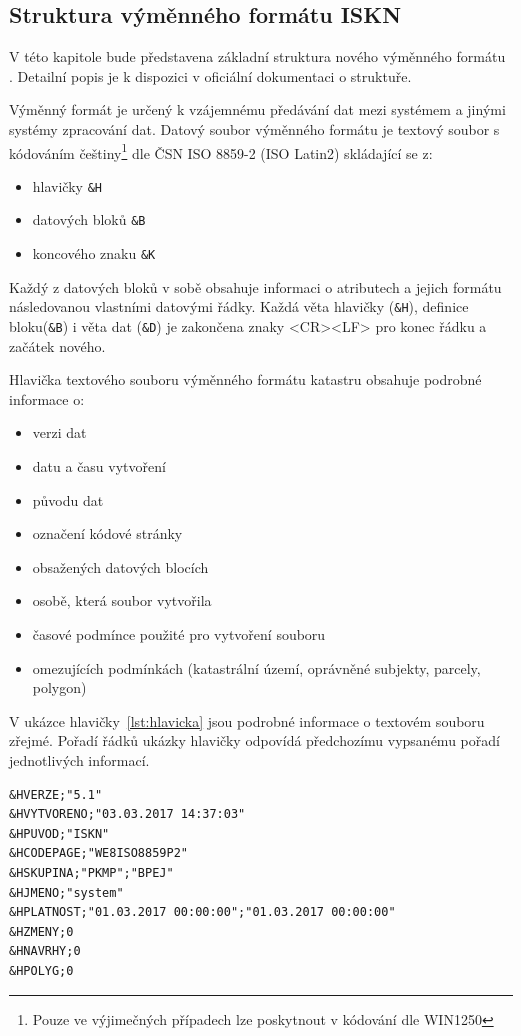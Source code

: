 \subsection{Struktura výměnného formátu ISKN}
V této kapitole bude představena základní struktura nového výměnného
formátu . Detailní popis je k dispozici v oficiální
dokumentaci o struktuře\cite{struktura_ISKN}.

Výměnný formát je určený k vzájemnému předávání dat mezi systémem
 a jinými systémy zpracování dat. Datový soubor výměnného
formátu je textový soubor s kódováním češtiny\footnote{Pouze ve
  výjimečných případech lze poskytnout v kódování dle WIN1250} dle ČSN
ISO 8859-2 (ISO Latin2) skládající se z:
\begin{itemize}[leftmargin=50pt]
		\item hlavičky \verb|&H|
		\item datových bloků \verb|&B|
		\item koncového znaku \verb|&K|
\end{itemize}

Každý z datových bloků v sobě obsahuje informaci o atributech a jejich formátu následovanou vlastními datovými řádky. Každá věta hlavičky (\verb|&H|), definice bloku(\verb|&B|) i věta dat (\verb|&D|) je zakončena znaky <CR><LF> pro konec řádku a začátek nového. %

Hlavička textového souboru výměnného formátu katastru obsahuje podrobné informace o:
\begin{itemize}[leftmargin=50pt]
		\item verzi dat
		\item datu a času vytvoření
		\item původu dat
		\item označení kódové stránky
		\item obsažených datových blocích
		\item osobě, která soubor vytvořila
		\item časové podmínce použité pro vytvoření souboru
		\item omezujících podmínkách (katastrální území, oprávněné subjekty, parcely, polygon)
\end{itemize}
V ukázce hlavičky~\ref{lst:hlavicka} jsou podrobné informace o
textovém souboru zřejmé. Pořadí řádků ukázky hlavičky odpovídá
předchozímu vypsanému pořadí jednotlivých informací.
\begin{lstlisting}[caption=Ukázka hlavičky neúplných dat, label=lst:hlavicka]
&HVERZE;"5.1"
&HVYTVORENO;"03.03.2017 14:37:03"
&HPUVOD;"ISKN"
&HCODEPAGE;"WE8ISO8859P2"
&HSKUPINA;"PKMP";"BPEJ"
&HJMENO;"system"
&HPLATNOST;"01.03.2017 00:00:00";"01.03.2017 00:00:00"
&HZMENY;0
&HNAVRHY;0
&HPOLYG;0
\end{lstlisting}

